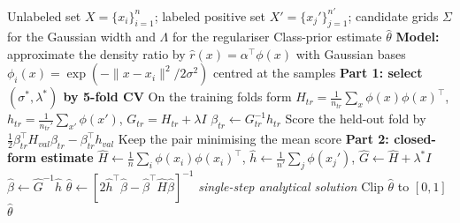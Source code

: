 \documentclass{article}
\begin{document}
\begin{algorithm}[!h]
\renewcommand{\algorithmicrequire}{\textbf{Input:}}
\renewcommand{\algorithmicensure}{\textbf{Output:}}
	\caption{PE direct estimator: class prior via Pearson-divergence partial matching}
	\begin{algorithmic}[1]
	    \REQUIRE
	    Unlabeled set $X=\{x_{i}\}_{i=1}^{n}$; labeled positive set $X'=\{x_{j}'\}_{j=1}^{n'}$;
	    candidate grids $\Sigma$ for the Gaussian width and $\Lambda$ for the regulariser
	    \ENSURE
	    Class-prior estimate $\hat{\theta}$
	    \STATE \textbf{Model:} approximate the density ratio by
	    $\hat{r}(x)=\alpha^{\top}\phi(x)$ with Gaussian bases
	    $\phi_{i}(x)=\exp\!\left(-\|x-x_{i}\|^{2}/2\sigma^{2}\right)$ centred at the samples %
	    \STATE \textbf{Part 1: select $(\sigma^{\ast},\lambda^{\ast})$ by 5-fold CV}
	    \FORALL{$(\sigma,\lambda)\in\Sigma\times\Lambda$}
	    \STATE On the training folds form
	    $H_{tr}=\frac{1}{n_{tr}}\sum_{x}\phi(x)\phi(x)^{\top}$,\quad
	    $h_{tr}=\frac{1}{n_{tr}'}\sum_{x'}\phi(x')$,\quad
	    $G_{tr}=H_{tr}+\lambda I$
	    \STATE $\beta_{tr}\leftarrow G_{tr}^{-1}h_{tr}$
	    \STATE Score the held-out fold by
	    $\frac{1}{2}\beta_{tr}^{\top}H_{val}\beta_{tr}-\beta_{tr}^{\top}h_{val}$ %
	    \ENDFOR
	    \ENDFOR
	    \STATE Keep the pair minimising the mean score
	    \STATE \textbf{Part 2: closed-form estimate}
	    \STATE $\hat{H}\leftarrow \frac{1}{n}\sum_{i}\phi(x_{i})\phi(x_{i})^{\top}$,\quad
	    $\hat{h}\leftarrow \frac{1}{n'}\sum_{j}\phi(x_{j}')$,\quad
	    $\hat{G}\leftarrow \hat{H}+\lambda^{\ast}I$
	    \STATE $\hat{\beta}\leftarrow \hat{G}^{-1}\hat{h}$
	    \STATE $\hat{\theta}\leftarrow \left[2\hat{h}^{\top}\hat{\beta}-\hat{\beta}^{\top}\hat{H}\hat{\beta}\right]^{-1}$
	    \hfill \emph{single-step analytical solution} %
	    \STATE Clip $\hat{\theta}$ to $[0,1]$
		\RETURN $\hat{\theta}$
	\end{algorithmic}
\end{algorithm}
%
\end{document}
